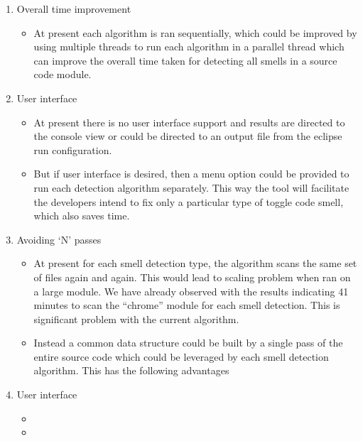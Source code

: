 \documentclass[conference]{IEEEtran}
\begin{document}
\begin{enumerate}

\item{Overall time improvement
\begin{itemize}
\item At present each algorithm is ran sequentially, which could be improved by using multiple threads to run each algorithm in a parallel thread which can improve the overall time taken for detecting all smells in a source code module.
\end{itemize}
}

\item{User interface
\begin{itemize}
\item At present there is no user interface support and results are directed to the console view or could be directed to an output file from the eclipse run configuration.
\item But if user interface is desired, then a menu option could be provided to run each detection algorithm separately. This way the tool will facilitate the developers intend to fix only a particular type of toggle code smell, which also saves time.
\end{itemize}
}

\item{Avoiding ‘N’ passes
\begin{itemize}
\item At present for each smell detection type, the algorithm scans the same set of files again and again. This would lead to scaling problem when ran on a large module. We have already observed with the results indicating 41 minutes to scan the “chrome” module for each smell detection. This is significant problem with the current algorithm.
\item Instead a common data structure could be built by a single pass of the entire source code which could be leveraged by each smell detection algorithm. This has the following advantages
\end{itemize}
}

\item{User interface
\begin{itemize}
\item 
\item
\end{itemize}
}



\end{enumerate}
\end{document}
